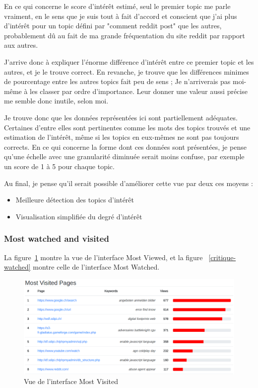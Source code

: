 		En ce qui concerne le score d'intérêt estimé, seul le premier topic me parle vraiment, en le sens que je suis tout à fait d'accord et conscient que j'ai plus d'intérêt pour un topic défini par "comment reddit post" que les autres, probablement dû au fait de ma grande fréquentation du site reddit par rapport aux autres.

		J'arrive donc à expliquer l'énorme différence d'intérêt entre ce premier topic et les autres, et je le trouve correct. En revanche, je trouve que les différences minimes de pourcentage entre les autres topics fait peu de sens ; Je n'arriverais pas moi-même à les classer par ordre d'importance. Leur donner une valeur aussi précise me semble donc inutile, selon moi.

		Je trouve donc que les données représentées ici sont partiellement adéquates. Certaines d'entre elles sont pertinentes comme les mots des topics trouvés et une estimation de l'intérêt, même si les topics en eux-mêmes ne sont pas toujours corrects. En ce qui concerne la forme dont ces données sont présentées, je pense qu'une échelle avec une granularité diminuée serait moins confuse, par exemple un score de 1 à 5 pour chaque topic.

		Au final, je pense qu'il serait possible d'améliorer cette vue par deux ces moyens :
		\begin{itemize}
			\item Meilleure détection des topics d'intérêt
			\item Visualisation simplifiée du degré d'intérêt
		\end{itemize}

\FloatBarrier

		\subsubsection{Most watched and visited}

		La figure~\ref{critique-visited} montre la vue de l'interface Most Viewed, et la figure ~\ref{critique-watched} montre celle de l'interface Most Watched.

		\begin{figure}[!h]
			\centering
			\includegraphics[width=1\textwidth]{images/results/critique-mostvisited}
			\caption{Vue de l'interface Most Visited}
			\label{critique-visited}
		\end{figure}


